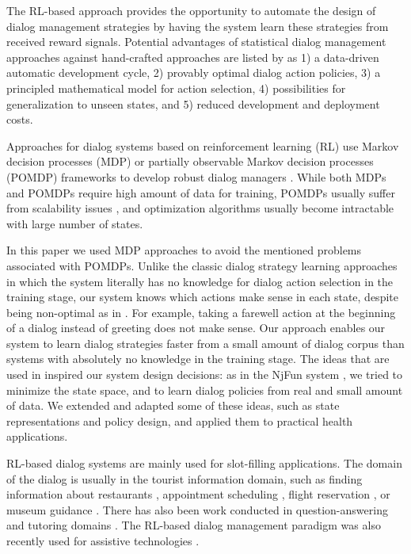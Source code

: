 \begin{sloppy}
The RL-based approach provides the opportunity to automate the design of dialog management strategies by having the system learn these strategies from received reward signals. Potential advantages of statistical dialog management approaches against hand-crafted approaches are listed by \cite{lemon2007machine} as  1) a data-driven automatic development cycle, 2) provably optimal dialog action policies, 3) a principled mathematical model for action selection, 4) possibilities for generalization to unseen states, and 5) reduced development and deployment costs.

Approaches for  dialog systems based on reinforcement learning (RL) use Markov decision processes (MDP) \cite{NjFunSingh02} or partially observable Markov decision processes (POMDP) frameworks \cite{young2010POMDP,williams2008best} to develop robust dialog managers \cite{frampton2009,young2013pomdp}. While both MDPs and POMDPs require high amount of data for training, POMDPs usually suffer from scalability issues \cite{williams2007partially,young2010hidden}, and optimization algorithms usually become intractable with large number of states. 

In this paper we used MDP approaches to avoid the mentioned problems associated with POMDPs. Unlike the classic dialog strategy learning approaches \cite{levin1998} in which the system literally has no knowledge for dialog action selection in the training stage, our system knows which actions make sense in each state,  despite being non-optimal as in \cite{NjFunSingh02}. For example, taking a farewell action at the beginning of a dialog instead of greeting does not make sense. Our approach enables our system to learn dialog strategies faster from a small amount of dialog corpus than systems with absolutely no knowledge in the training stage. 
The ideas that are used in \cite{NjFunSingh02} inspired our system design decisions: as in the NjFun system \cite{NjFunSingh02}, we tried to minimize the state space, and to learn dialog policies from real and small amount of data. We extended and adapted some of these ideas, such as state representations and policy design, and applied them to practical health applications.

RL-based dialog systems are mainly used for slot-filling applications. The domain of the dialog is usually in the tourist information domain, such as finding information about restaurants \cite{jurvcivcek2012reinforcement,Chandramohan2010,young2010POMDP}, appointment scheduling \cite{Georgila2010}, flight reservation \cite{henderson2008hybrid}, or museum guidance \cite{Papangelis2012}. There has also been work conducted in question-answering \cite{misu2012reinforcement} and tutoring domains \cite{chi2010micro}. The RL-based dialog management paradigm  was also recently used for assistive technologies  \cite{liAssistivePomdp2013}. 


\end{sloppy}
